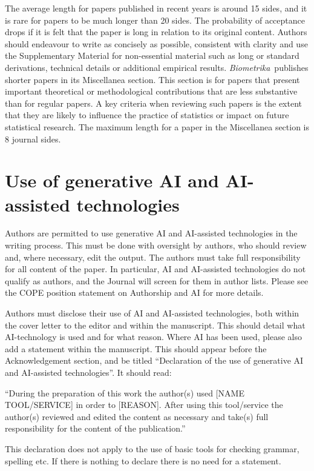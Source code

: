 \documentclass[lineno]{biometrika}
\def\Bka{{\it Biometrika}}
\begin{document}
The average length for papers published in recent years is around 15 sides, and it is rare for papers to be much longer than 20 sides. The probability of acceptance drops if it is felt that the paper is long in relation to its original content. Authors should endeavour to write as concisely as possible, consistent with clarity and use the Supplementary Material for non-essential material such as long or standard derivations, technical details or additional empirical results.
\Bka\ publishes shorter papers in its Miscellanea section. This section is for papers that present important theoretical or methodological contributions that are less substantive than for regular papers. A key criteria when reviewing such papers is the extent that they are likely to influence the practice of statistics or impact on future statistical research. The maximum length for a paper in the Miscellanea section is 8 journal sides. 


\section{Use of generative AI and AI-assisted technologies}
Authors are permitted to use generative AI and AI-assisted technologies in the writing process. This must be done with oversight by authors, who should review and, where necessary, edit the output. The authors must take full responsibility for all content of the paper. In particular, AI and AI-assisted technologies do not qualify as authors, and the Journal will screen for them in author lists. Please see the COPE position statement on Authorship and AI for more details.
 
Authors must disclose their use of AI and AI-assisted technologies, both within the cover letter to the editor and within the manuscript. This should detail what AI-technology is used and for what reason. Where AI has been used, please also add a statement within the manuscript. This should appear before the Acknowledgement section, and be titled ``Declaration of the use of generative AI and AI-assisted technologies''. It should read:
 
``During the preparation of this work the author(s) used [NAME TOOL/SERVICE] in order to [REASON]. After using this tool/service the author(s) reviewed and edited the content as necessary and take(s) full responsibility for the content of the publication.''
 
This declaration does not apply to the use of basic tools for checking grammar, spelling etc. If there is nothing to declare there is no need for a statement.
 
\end{document}
